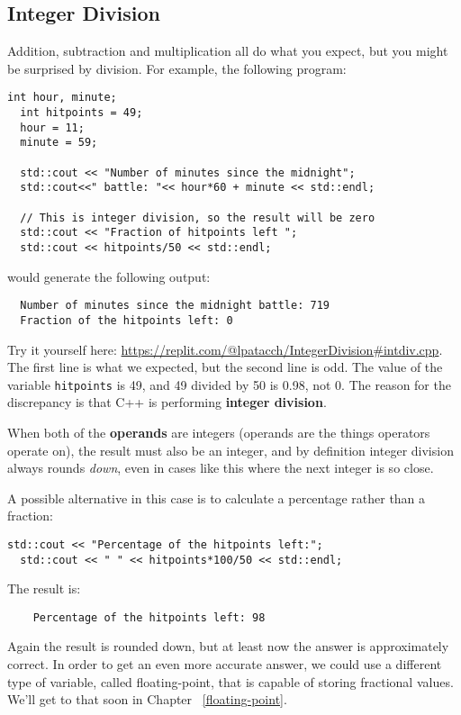 \subsection{Integer Division}
Addition, subtraction and multiplication all do what you
expect, but you might be surprised by division.  For example,
the following program:

\begin{lstlisting}[frame=single]
  int hour, minute;
  int hitpoints = 49;
  hour = 11;
  minute = 59;
  
  std::cout << "Number of minutes since the midnight";
  std::cout<<" battle: "<< hour*60 + minute << std::endl;

  // This is integer division, so the result will be zero
  std::cout << "Fraction of hitpoints left ";
  std::cout << hitpoints/50 << std::endl;
\end{lstlisting}
%

would generate the following output:

\begin{verbatim}
  Number of minutes since the midnight battle: 719
  Fraction of the hitpoints left: 0
\end{verbatim}
%
Try it yourself here: \url{https://replit.com/@lpatacch/IntegerDivision#intdiv.cpp}.
The first line is what we expected, but the second line is
odd.  The value of the variable {\tt hitpoints} is 49, and
49 divided by 50 is 0.98, not 0.  The reason for the
discrepancy is that C++ is performing {\bf integer division}.


When both of the {\bf operands} are integers (operands are the things
operators operate on), the result must also be an integer,
and by definition integer division always rounds {\em down},
even in cases like this where the next integer is so close.

A possible alternative in this case is to calculate a percentage
rather than a fraction:

\begin{lstlisting}[frame=single]
  std::cout << "Percentage of the hitpoints left:";
  std::cout << " " << hitpoints*100/50 << std::endl;
\end{lstlisting}

%
The result is:

\begin{verbatim}
    Percentage of the hitpoints left: 98
\end{verbatim}
%
Again the result is rounded down, but at least now the answer
is approximately correct.  In order to get an even more accurate
answer, we could use a different type of variable, called
floating-point, that is capable of storing fractional values.
We'll get to that soon in Chapter ~\ref{floating-point}.


